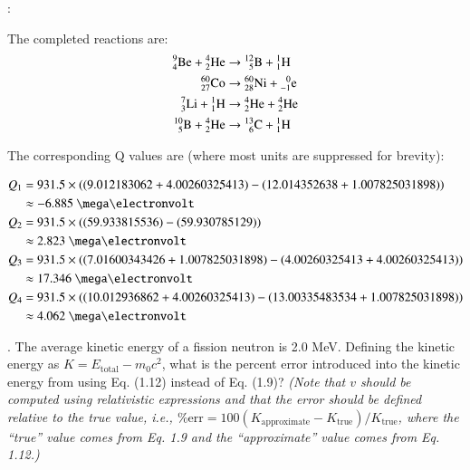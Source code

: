 \vspace{0.5cm}
\ifsolved
{
\color{purple}

:

The completed reactions are:
\begin{equation*}
 \begin{split}
  \isoAZ{Be}{9}{4} + \isoAZ{He}{4}{2} &\rightarrow \isoAZ{B}{12}{5} + \isoAZ{H}{1}{1} \\
  \isoAZ{Co}{60}{27} &\rightarrow \isoAZ{Ni}{60}{28}  + \isoAZ{e}{0}{-1} \\
  \isoAZ{Li}{7}{3} + \isoAZ{H}{1}{1} &\rightarrow \isoAZ{He}{4}{2}  + \isoAZ{He}{4}{2} \\
  \isoAZ{B}{10}{5} + \isoAZ{He}{4}{2} &\rightarrow \isoAZ{C}{13}{6}  + \isoAZ{H}{1}{1} \\
 \end{split}
\end{equation*}

The corresponding Q values are (where most units are suppressed for brevity):

\begin{equation*}
 \begin{split}
Q_1 &= 931.5 \times ((9.012183062+4.00260325413)-(12.014352638+1.007825031898)) \\
    &\approx -6.885~\mega\electronvolt\\
Q_2 &= 931.5 \times ((59.933815536)-(59.930785129)) \\
    &\approx 2.823~\mega\electronvolt\\
Q_3 &= 931.5 \times ((7.01600343426+1.007825031898)-(4.00260325413+4.00260325413)) \\
    &\approx 17.346~\mega\electronvolt\\
Q_4 &= 931.5 \times ((10.012936862+4.00260325413)-(13.00335483534+1.007825031898)) \\
    &\approx 4.062~\mega\electronvolt\\
 \end{split}
\end{equation*}

}
\newpage
\else
\fi



.
The average kinetic energy of a fission neutron is 2.0 MeV. Defining the kinetic energy as $K = E_{\text{total}} - m_0 c^2$, what is the percent error introduced into the kinetic energy from using Eq. (1.12) instead of Eq. (1.9)?  {\it (Note that $v$ should be computed using relativistic expressions and that the  error should be defined relative to the true value, i.e., $\%\text{err} = 100(K_{\text{approximate}}-K_{\text{true}})/K_{\text{true}}$, where the ``true'' value comes from Eq. 1.9 and the ``approximate'' value comes from Eq. 1.12.)}




